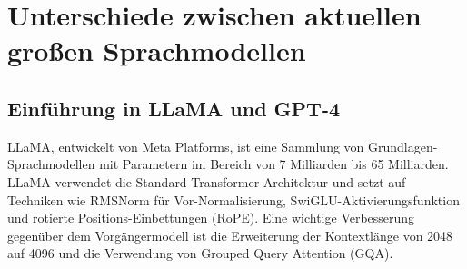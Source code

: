 \section{Unterschiede zwischen aktuellen großen Sprachmodellen}

\subsection{Einführung in LLaMA und GPT-4}
LLaMA, entwickelt von Meta Platforms, ist eine Sammlung von Grundlagen-Sprachmodellen mit Parametern im Bereich von 7 Milliarden bis 65 Milliarden. 
LLaMA verwendet die Standard-Transformer-Architektur und setzt auf Techniken wie RMSNorm für Vor-Normalisierung, SwiGLU-Aktivierungsfunktion und rotierte Positions-Einbettungen (RoPE). 
Eine wichtige Verbesserung gegenüber dem Vorgängermodell ist die Erweiterung der Kontextlänge von 2048 auf 4096 und die Verwendung von Grouped Query Attention (GQA).